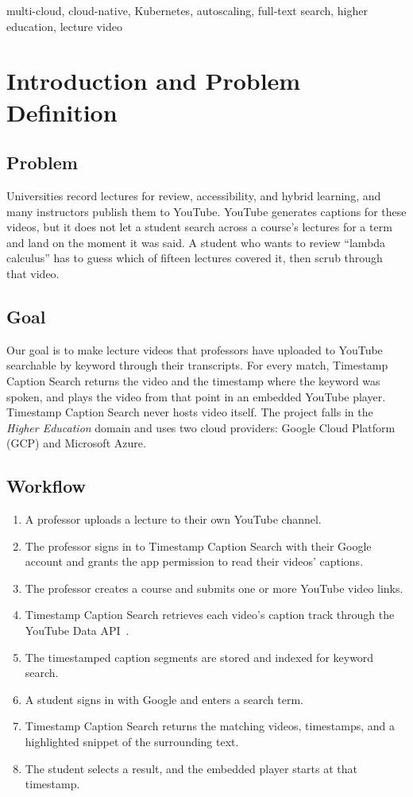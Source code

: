 \documentclass[conference]{IEEEtran}
\begin{document}
\begin{IEEEkeywords}
multi-cloud, cloud-native, Kubernetes, autoscaling, full-text search, higher education, lecture video
\end{IEEEkeywords}

\section{Introduction and Problem Definition}

\subsection{Problem}
Universities record lectures for review, accessibility, and hybrid learning, and many instructors publish them to YouTube. YouTube generates captions for these videos, but it does not let a student search across a course's lectures for a term and land on the moment it was said. A student who wants to review ``lambda calculus'' has to guess which of fifteen lectures covered it, then scrub through that video.

\subsection{Goal}
Our goal is to make lecture videos that professors have uploaded to YouTube searchable by keyword through their transcripts. For every match, Timestamp Caption Search returns the video and the timestamp where the keyword was spoken, and plays the video from that point in an embedded YouTube player. Timestamp Caption Search never hosts video itself. The project falls in the \emph{Higher Education} domain and uses two cloud providers: Google Cloud Platform (GCP) and Microsoft Azure.

\subsection{Workflow}
\begin{enumerate}
\item A professor uploads a lecture to their own YouTube channel.
\item The professor signs in to Timestamp Caption Search with their Google account and grants the app permission to read their videos' captions.
\item The professor creates a course and submits one or more YouTube video links.
\item Timestamp Caption Search retrieves each video's caption track through the YouTube Data API~\cite{yt-captions}.
\item The timestamped caption segments are stored and indexed for keyword search.
\item A student signs in with Google and enters a search term.
\item Timestamp Caption Search returns the matching videos, timestamps, and a highlighted snippet of the surrounding text.
\item The student selects a result, and the embedded player starts at that timestamp.
\end{enumerate}
\end{document}
